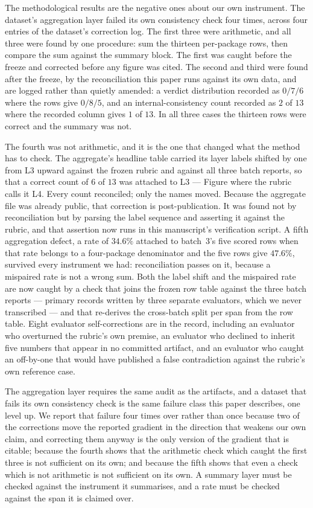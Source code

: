 \documentclass[sigconf,review]{acmart}
\begin{document}
The methodological results are the negative ones about our own instrument. The
dataset's aggregation layer failed its own consistency check four times, across
four entries of the dataset's correction log. The first three were arithmetic,
and all three were found by one procedure: sum the thirteen per-package rows,
then compare the sum against the summary block. The first was caught before the
freeze and corrected before any figure was cited. The second and third were
found after the freeze, by the reconciliation this paper runs against its own
data, and are logged rather than quietly amended: a verdict distribution
recorded as $0 / 7 / 6$ where the rows give $0 / 8 / 5$, and an
internal-consistency count recorded as $2$ of $13$ where the recorded column
gives $1$ of $13$. In all three cases the thirteen rows were correct and the
summary was not.

The fourth was not arithmetic, and it is the one that changed what the method
has to check. The aggregate's headline table carried its layer labels shifted by
one from L3 upward against the frozen rubric and against all three batch
reports, so that a correct count of $6$ of $13$ was attached to L3 --- Figure
where the rubric calls it L4. Every count reconciled; only the names moved.
Because the aggregate file was already public, that correction is
post-publication. It was found not by reconciliation but by parsing the label
sequence and asserting it against the rubric, and that assertion now runs in
this manuscript's verification script. A fifth aggregation defect, a rate of
$34.6\%$ attached to batch~3's five scored rows when that rate belongs to a
four-package denominator and the five rows give $47.6\%$, survived every
instrument we had: reconciliation passes on it, because a mispaired rate is not
a wrong sum. Both the label shift and the mispaired rate are now caught by a
check that joins the frozen row table against the three batch reports --- primary
records written by three separate evaluators, which we never transcribed --- and
that re-derives the cross-batch split per span from the row table. Eight
evaluator self-corrections are in the record, including an evaluator who
overturned the rubric's own premise, an evaluator who declined to inherit five
numbers that appear in no committed artifact, and an evaluator who caught an
off-by-one that would have published a false contradiction against the rubric's
own reference case.

The aggregation layer requires the same audit as the artifacts, and a dataset
that fails its own consistency check is the same failure class this paper
describes, one level up. We report that failure four times over rather than
once because two of the corrections move the reported gradient in the direction
that weakens our own claim, and correcting them anyway is the only version of
the gradient that is citable; because the fourth shows that the arithmetic check
which caught the first three is not sufficient on its own; and because the
fifth shows that even a check which is not arithmetic is not sufficient on its
own. A summary layer must be checked against the instrument it summarises, and
a rate must be checked against the span it is claimed over.
\end{document}
